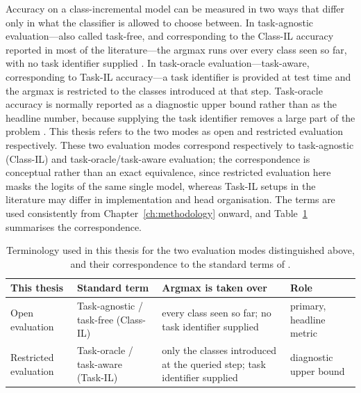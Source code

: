 Accuracy on a class-incremental model can be measured in two ways that
differ only in what the classifier is allowed to choose between. In
task-agnostic evaluation---also called task-free, and corresponding to the
Class-IL accuracy reported in most of the literature---the argmax runs over
every class seen so far, with no task identifier supplied \parencite{masana2020classincremental,delange2022continual}. In task-oracle evaluation---task-aware,
corresponding to Task-IL accuracy---a task identifier is provided at test
time and the argmax is restricted to the classes introduced at that step.
Task-oracle accuracy is normally reported as a diagnostic upper bound
rather than as the headline number, because supplying the task identifier
removes a large part of the problem \parencite{masana2020classincremental}. This thesis
refers to the two modes as open and restricted evaluation respectively.
These two evaluation modes correspond respectively to task-agnostic
(Class-IL) and task-oracle/task-aware evaluation; the correspondence is
conceptual rather than an exact equivalence, since restricted evaluation
here masks the logits of the same single model, whereas Task-IL setups in
the literature may differ in implementation and head organisation. The
terms are used consistently from Chapter~\ref{ch:methodology} onward, and
Table~\ref{tab:ch2-eval-terminology} summarises the correspondence.

\begin{table}[htbp]
\centering
\begin{tabularx}{\textwidth}{@{}>{\raggedright\arraybackslash}p{2.6cm} >{\raggedright\arraybackslash}p{3.1cm} X >{\raggedright\arraybackslash}p{2.4cm}@{}}
\toprule
\textbf{This thesis} & \textbf{Standard term} & \textbf{Argmax is taken over} & \textbf{Role} \\
\midrule
Open evaluation & Task-agnostic / task-free (Class-IL) & every class seen so far; no task identifier supplied & primary, headline metric \\
Restricted evaluation & Task-oracle / task-aware (Task-IL) & only the classes introduced at the queried step; task identifier supplied & diagnostic upper bound \\
\bottomrule
\end{tabularx}
\caption[Open/restricted evaluation terminology]{Terminology used in this
thesis for the two evaluation modes distinguished above, and their
correspondence to the standard terms of \cite{masana2020classincremental}.}
\label{tab:ch2-eval-terminology}
\end{table}

